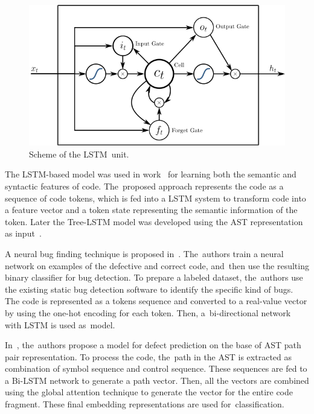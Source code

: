 \documentclass[mathematics,review,accept,moreauthors,pdftex]{Definitions/mdpi}
\begin{document}
\begin{figure}[H] %
\includegraphics[width=11.5 cm]{f3.png}
\caption{Scheme of the LSTM~unit.}
\label{fig3} %
\end{figure}


The LSTM-based model was used in work~\cite{DamEtAl2018} for learning both the semantic and syntactic features of code. The~proposed approach represents the code as a sequence of code tokens, which is fed into a LSTM system to transform code into a feature vector and a token state representing the semantic information of the token. Later the Tree-LSTM model was developed using the AST representation as input~\cite{DamEtAl2019}.

A neural bug finding technique is proposed in~\cite{HabibPradel2019}. The~authors train a neural network on examples of the defective and correct code, and~then use the resulting binary classifier for bug detection.
To prepare a labeled dataset, the~authors use the existing static bug detection software to identify the specific kind of bugs.
The code is represented as a tokens sequence and converted to a real-value vector by using the one-hot encoding for each token.
Then, a~bi-directional network with LSTM is used as~model.

In~\cite{ShiEtAl2020}, the~authors propose a model for defect prediction on the base of AST path pair representation.
To process the code, the~path in the AST is extracted as combination of symbol sequence and control sequence. These sequences are fed to a Bi-LSTM network to generate a path vector. Then, all the vectors are combined using the global attention technique to generate the vector for the entire code fragment. These final embedding representations are used for~classification.
\end{document}
